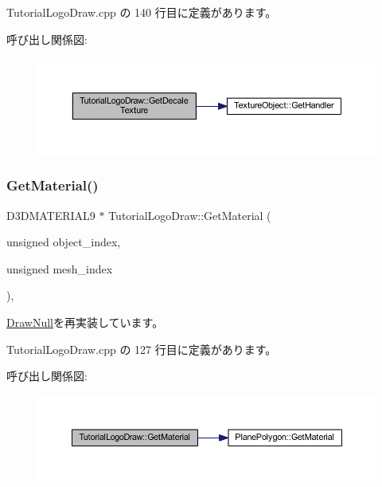  Tutorial\+Logo\+Draw.\+cpp の 140 行目に定義があります。

呼び出し関係図\+:\nopagebreak
\begin{figure}[H]
\begin{center}
\leavevmode
\includegraphics[width=350pt]{class_tutorial_logo_draw_ad9df98aa8a5b11872dba6f6609589035_cgraph}
\end{center}
\end{figure}
\mbox{\label{class_tutorial_logo_draw_a3a97860361e32a727246e99052715f37}} 
\subsubsection{\texorpdfstring{Get\+Material()}{GetMaterial()}}
{\footnotesize\ttfamily D3\+D\+M\+A\+T\+E\+R\+I\+A\+L9 $\ast$ Tutorial\+Logo\+Draw\+::\+Get\+Material (\begin{DoxyParamCaption}\item[{unsigned}]{object\+\_\+index,  }\item[{unsigned}]{mesh\+\_\+index }\end{DoxyParamCaption})\hspace{0.3cm}{\ttfamily [override]}, {\ttfamily [virtual]}}



\mbox{\hyperlink{class_draw_null_a84969d22d3436986f214e9896fe44fc6}{Draw\+Null}}を再実装しています。



 Tutorial\+Logo\+Draw.\+cpp の 127 行目に定義があります。

呼び出し関係図\+:\nopagebreak
\begin{figure}[H]
\begin{center}
\leavevmode
\includegraphics[width=350pt]{class_tutorial_logo_draw_a3a97860361e32a727246e99052715f37_cgraph}
\end{center}
\end{figure}
\mbox{\label{class_tutorial_logo_draw_ab700e592d00574dff6ee342138343d7b}} 
